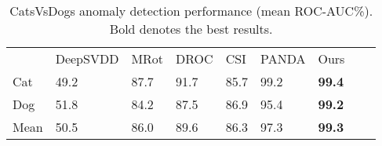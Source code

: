 \documentclass[letterpaper]{article} \usepackage{aaai23}  \usepackage{times}  \usepackage{helvet}  \usepackage{courier}  \usepackage[hyphens]{url}  \usepackage{graphicx} \usepackage{amsmath, amssymb}
\begin{document}
\begin{table*}[ht]
  \centering
  \begin{tabular}{lllllllll}
    \toprule
&	DeepSVDD 	&	MRot	&	DROC 	&	CSI 	&	PANDA 	&	Ours	\\

    \cmidrule(r){1-1}
    \cmidrule(r){2-7}

Cat	&	49.2	&	87.7	&	91.7	&	85.7	&	99.2	&	\textbf{99.4}	\\
Dog	&	51.8	&	84.2	&	87.5	&	86.9	&	95.4	&	\textbf{99.2}	\\
						
    \cmidrule(r){1-1}
    \cmidrule(r){2-7}

Mean	&	50.5	&	86.0	&	89.6	&	86.3	&	97.3	&	\textbf{99.3}	\\	

    \bottomrule
  \end{tabular}
\caption{CatsVsDogs anomaly detection performance (mean ROC-AUC\%). Bold denotes the best results.}
\label{tab:catsdogs}
\end{table*}
\end{document}
